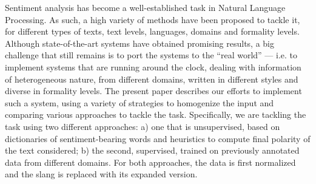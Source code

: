 Sentiment analysis has become a well-established task in Natural Language Processing. As such, a high variety of methods have been proposed to tackle it, for different types of texts, text levels, languages, domains and formality levels.  Although state-of-the-art systems have obtained promising results, a big challenge that still remains is to port the systems to the ``real world'' --- i.e. to implement systems that are running around the clock, dealing with information of heterogeneous nature, from different domains, written in different styles and diverse in formality levels. The present paper describes our efforts to implement such a system, using a variety of strategies to homogenize the input and comparing various approaches to tackle the task. Specifically, we are tackling the task using two different approaches: a) one that is unsupervised, based on dictionaries of sentiment-bearing words and heuristics to compute final polarity of the text considered; b) the second, supervised, trained on previously annotated data from different domains. For both approaches, the data is first normalized and the slang is replaced with its expanded version.
